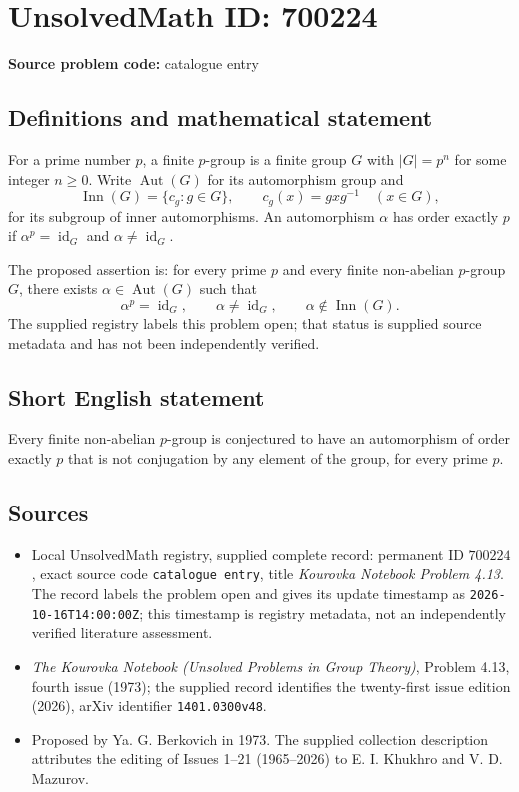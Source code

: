 \documentclass[11pt]{article}
\begin{document}
\section*{UnsolvedMath ID: 700224}
\textbf{Source problem code:} catalogue entry
\subsection{Definitions and mathematical statement}
For a prime number \(p\), a finite \(p\)-group is a finite group \(G\) with \(|G|=p^n\) for some integer \(n\geq 0\). Write \(\operatorname{Aut}(G)\) for its automorphism group and
\[
\operatorname{Inn}(G)=\{c_g:g\in G\},\qquad c_g(x)=gxg^{-1}\quad(x\in G),
\]
for its subgroup of inner automorphisms. An automorphism \(\alpha\) has order exactly \(p\) if \(\alpha^p=\operatorname{id}_G\) and \(\alpha\ne\operatorname{id}_G\).

The proposed assertion is: for every prime \(p\) and every finite non-abelian \(p\)-group \(G\), there exists \(\alpha\in\operatorname{Aut}(G)\) such that
\[
\alpha^p=\operatorname{id}_G,\qquad
\alpha\ne\operatorname{id}_G,\qquad
\alpha\notin\operatorname{Inn}(G).
\]
The supplied registry labels this problem open; that status is supplied source metadata and has not been independently verified.
\subsection{Short English statement}
Every finite non-abelian \(p\)-group is conjectured to have an automorphism of order exactly \(p\) that is not conjugation by any element of the group, for every prime \(p\).
\subsection{Sources}
\begin{itemize}
\item Local UnsolvedMath registry, supplied complete record: permanent ID \(700224\), exact source code \texttt{catalogue entry}, title \emph{Kourovka Notebook Problem 4.13}. The record labels the problem open and gives its update timestamp as \texttt{2026-10-16T14:00:00Z}; this timestamp is registry metadata, not an independently verified literature assessment.
\item \emph{The Kourovka Notebook (Unsolved Problems in Group Theory)}, Problem 4.13, fourth issue (1973); the supplied record identifies the twenty-first issue edition (2026), arXiv identifier \texttt{1401.0300v48}.
\item Proposed by Ya. G. Berkovich in 1973. The supplied collection description attributes the editing of Issues 1--21 (1965--2026) to E. I. Khukhro and V. D. Mazurov.
\end{itemize}
\end{document}
